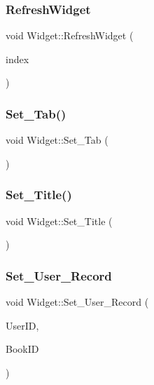 \subsubsection{\texorpdfstring{RefreshWidget}{RefreshWidget}}
{\footnotesize\ttfamily void Widget\+::\+Refresh\+Widget (\begin{DoxyParamCaption}\item[{int}]{index }\end{DoxyParamCaption})\hspace{0.3cm}{\ttfamily [slot]}}

\mbox{\label{class_widget_ac611086a6f74fe7bab712f23ab7126d8}} 
\subsubsection{\texorpdfstring{Set\_Tab()}{Set\_Tab()}}
{\footnotesize\ttfamily void Widget\+::\+Set\+\_\+\+Tab (\begin{DoxyParamCaption}{ }\end{DoxyParamCaption})}

\mbox{\label{class_widget_a5323ca5c4124c0d187a2f1398ef48844}} 
\subsubsection{\texorpdfstring{Set\_Title()}{Set\_Title()}}
{\footnotesize\ttfamily void Widget\+::\+Set\+\_\+\+Title (\begin{DoxyParamCaption}{ }\end{DoxyParamCaption})}

\mbox{\label{class_widget_a97f2c2eda030b7236e02c5f5e10c8926}} 
\subsubsection{\texorpdfstring{Set\_User\_Record}{Set\_User\_Record}}
{\footnotesize\ttfamily void Widget\+::\+Set\+\_\+\+User\+\_\+\+Record (\begin{DoxyParamCaption}\item[{Q\+String}]{User\+ID,  }\item[{Q\+String}]{Book\+ID }\end{DoxyParamCaption})\hspace{0.3cm}{\ttfamily [slot]}}

